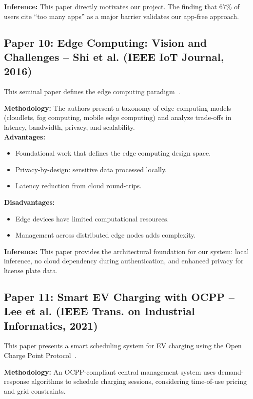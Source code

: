 \documentclass[11pt]{report}
\begin{document}
\textbf{Inference:}
This paper directly motivates our project. The finding that 67\% of users cite ``too many apps'' as a major barrier validates our app-free approach.

\subsection{Paper 10: Edge Computing: Vision and Challenges -- Shi et al. (IEEE IoT Journal, 2016)}
This seminal paper defines the edge computing paradigm~\cite{shi2016}. \par

\textbf{Methodology:} The authors present a taxonomy of edge computing models (cloudlets, fog computing, mobile edge computing) and analyze trade-offs in latency, bandwidth, privacy, and scalability. \\

\textbf{Advantages:}
\begin{itemize}
    \item Foundational work that defines the edge computing design space.
    \item Privacy-by-design: sensitive data processed locally.
    \item Latency reduction from cloud round-trips.
\end{itemize}

\textbf{Disadvantages:}
\begin{itemize}
    \item Edge devices have limited computational resources.
    \item Management across distributed edge nodes adds complexity.
\end{itemize}

\textbf{Inference:}
This paper provides the architectural foundation for our system: local inference, no cloud dependency during authentication, and enhanced privacy for license plate data.

\subsection{Paper 11: Smart EV Charging with OCPP -- Lee et al. (IEEE Trans. on Industrial Informatics, 2021)}
This paper presents a smart scheduling system for EV charging using the Open Charge Point Protocol~\cite{lee2021}. \par

\textbf{Methodology:} An OCPP-compliant central management system uses demand-response algorithms to schedule charging sessions, considering time-of-use pricing and grid constraints. \\
\end{document}
